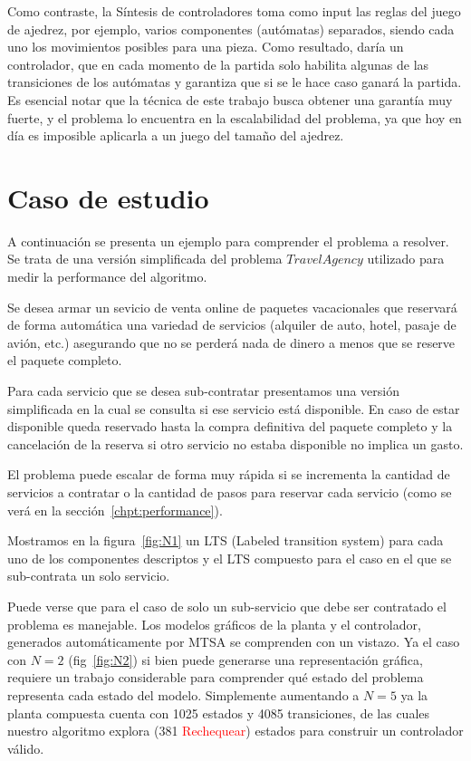 Como contraste, la Síntesis de controladores toma como input las reglas del juego de ajedrez, por ejemplo, varios componentes (autómatas) separados, siendo cada uno los movimientos posibles para una pieza. Como resultado, daría un controlador, que en cada momento de la partida solo habilita algunas de las transiciones de los autómatas y garantiza que si se le hace caso ganará la partida. Es esencial notar que la técnica de este trabajo busca obtener una garantía muy fuerte, y el problema lo encuentra en la escalabilidad del problema, ya que hoy en día es imposible aplicarla a un juego del tamaño del ajedrez.

\section{Caso de estudio}\label{chpt:casoAviones}
A continuación se presenta un ejemplo para comprender el problema a resolver. Se trata de una versión simplificada del problema $Travel Agency$ utilizado para medir la performance del algoritmo.

Se desea armar un sevicio de venta online de paquetes vacacionales que reservará de forma automática una variedad de servicios (alquiler de auto, hotel, pasaje de avión, etc.) asegurando que no se perderá nada de dinero a menos que se reserve el paquete completo.

Para cada servicio que se desea sub-contratar presentamos una versión simplificada en la cual se consulta si ese servicio está disponible. En caso de estar disponible queda reservado hasta la compra definitiva del paquete completo y la cancelación de la reserva si otro servicio no estaba disponible no implica un gasto.

El problema puede escalar de forma muy rápida si se incrementa la cantidad de servicios a contratar o la cantidad de pasos para reservar cada servicio (como se verá en la sección~\ref{chpt:performance}).

Mostramos en la figura~\ref{fig:N1} un LTS (Labeled transition system) para cada uno de los componentes descriptos y el LTS compuesto para el caso en el que se sub-contrata un solo servicio.

Puede verse que para el caso de solo un sub-servicio que debe ser contratado el problema es manejable. Los modelos gráficos de la planta y el controlador, generados automáticamente por MTSA se comprenden con un vistazo. Ya el caso con $N=2$ (fig~\ref{fig:N2}) si bien puede generarse una representación gráfica, requiere un trabajo considerable para comprender qué estado del problema representa cada estado del modelo. Simplemente aumentando a $N=5$ ya la planta compuesta cuenta con 1025 estados y 4085 transiciones, de las cuales nuestro algoritmo explora (381 \textcolor{red}{Rechequear}) estados para construir un controlador válido.

